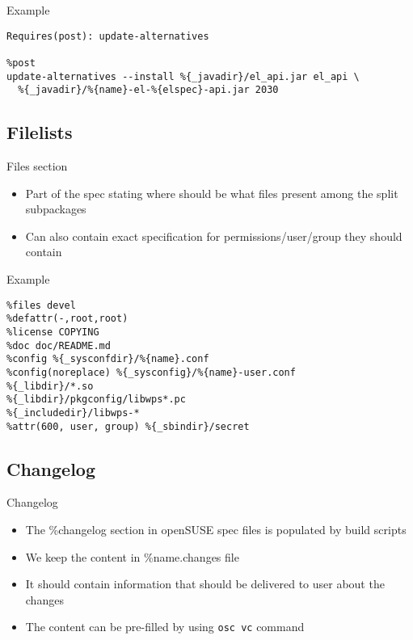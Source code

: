 \documentclass{beamer}
\begin{document}
\begin{frame}[fragile]{Example}
	\begin{small}
	\begin{verbatim}
Requires(post): update-alternatives

%post
update-alternatives --install %{_javadir}/el_api.jar el_api \
  %{_javadir}/%{name}-el-%{elspec}-api.jar 2030
	\end{verbatim}
	\end{small}
\end{frame}

\subsection{Filelists}

\begin{frame}[t]{Files section}
	\begin{itemize}
	\item Part of the spec stating where should be what files present among the split subpackages
    \item Can also contain exact specification for permissions/user/group they should contain
	\end{itemize}
\end{frame}

\begin{frame}[fragile]{Example}
	\begin{small}
	\begin{verbatim}
%files devel
%defattr(-,root,root)
%license COPYING
%doc doc/README.md
%config %{_sysconfdir}/%{name}.conf
%config(noreplace) %{_sysconfig}/%{name}-user.conf
%{_libdir}/*.so
%{_libdir}/pkgconfig/libwps*.pc
%{_includedir}/libwps-*
%attr(600, user, group) %{_sbindir}/secret
	\end{verbatim}
	\end{small}
\end{frame}

\subsection{Changelog}

\begin{frame}[t]{Changelog}
	\begin{itemize}
	\item The \%changelog section in openSUSE spec files is populated by build scripts
	\item We keep the content in \%{name}.changes file
    \item It should contain information that should be delivered to user about the changes
    \item The content can be pre-filled by using \texttt{osc vc} command
	\end{itemize}
\end{frame}
\end{document}
